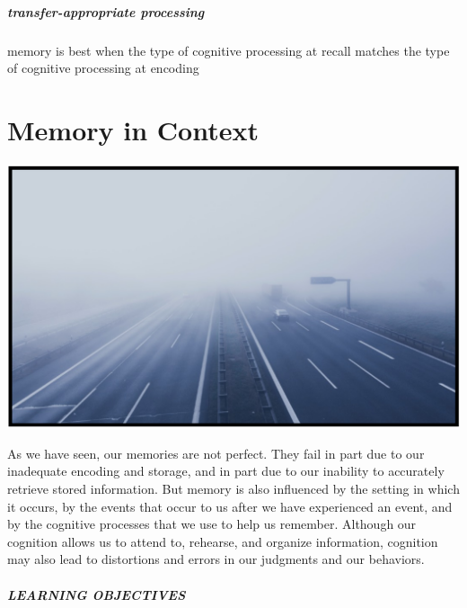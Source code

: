 \documentclass[
]{krantz}
\begin{document}
\hypertarget{transfer-appropriate-processing}{%
\paragraph*{transfer-appropriate processing}\label{transfer-appropriate-processing}}

memory is best when the type of cognitive processing at recall matches the type of cognitive processing at encoding

\hypertarget{memory-in-context}{%
\chapter{Memory in Context}\label{memory-in-context}}

\begin{center}\includegraphics[width=1\linewidth]{images/ch6/fig0} \end{center}

As we have seen, our memories are not perfect. They fail in part due to our inadequate encoding and storage, and in part due to our inability to accurately retrieve stored information. But memory is also influenced by the setting in which it occurs, by the events that occur to us after we have experienced an event, and by the cognitive processes that we use to help us remember. Although our cognition allows us to attend to, rehearse, and organize information, cognition may also lead to distortions and errors in our judgments and our behaviors.

\hypertarget{learning-objectives-5}{%
\paragraph*{LEARNING OBJECTIVES}\label{learning-objectives-5}}
\end{document}
